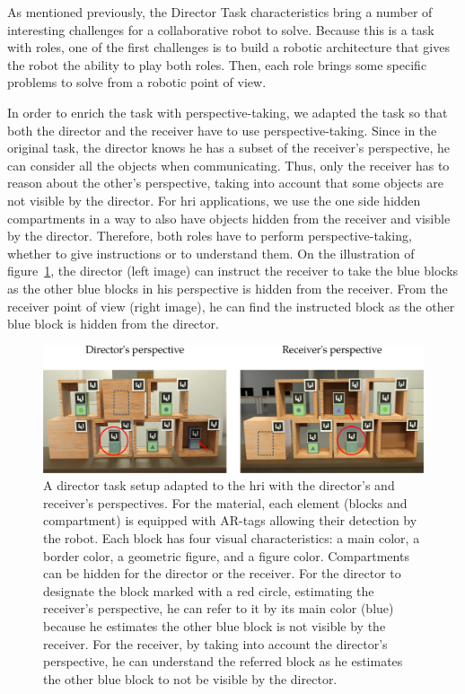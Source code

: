 As mentioned previously, the Director Task characteristics bring a number of interesting challenges for a collaborative robot to solve. Because this is a task with roles, one of the first challenges is to build a robotic architecture that gives the robot the ability to play both roles. Then, each role brings some specific problems to solve from a robotic point of view.

In order to enrich the task with perspective-taking, we adapted the task so that both the director and the receiver have to use perspective-taking. Since in the original task, the director knows he has a subset of the receiver's perspective, he can consider all the objects when communicating. Thus, only the receiver has to reason about the other's perspective, taking into account that some objects are not visible by the director. For \acrshort{hri} applications, we use the one side hidden compartments in a way to also have objects hidden from the receiver and visible by the director. Therefore, both roles have to perform perspective-taking, whether to give instructions or to understand them. On the illustration of figure~\ref{fig:chap9_setup}, the director (left image) can instruct the receiver to take the blue blocks as the other blue blocks in his perspective is hidden from the receiver. From the receiver point of view (right image), he can find the instructed block as the other blue block is hidden from the director.

\begin{figure}[ht!]
\centering
\includegraphics[width=\textwidth]{figures/chapter9/setup.png}
\caption{\label{fig:chap9_setup} A director task setup adapted to the \acrshort{hri} with the director's and receiver's perspectives. For the material, each element (blocks and compartment) is equipped with AR-tags allowing their detection by the robot. Each block has four visual characteristics: a main color, a border color, a geometric figure, and a figure color. Compartments can be hidden for the director or the receiver. For the director to designate the block marked with a red circle, estimating the receiver's perspective, he can refer to it by its main color (blue) because he estimates the other blue block is not visible by the receiver. For the receiver, by taking into account the director's perspective, he can understand the referred block as he estimates the other blue block to not be visible by the director.}
\end{figure}

